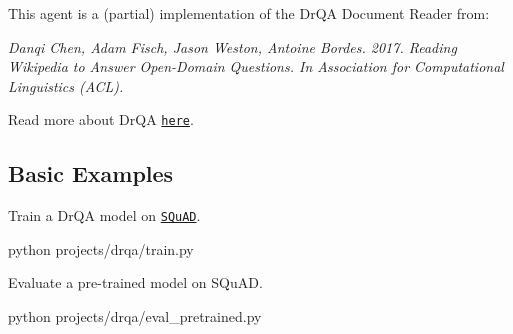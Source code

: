 This agent is a (partial) implementation of the Dr\+QA Document Reader from\+:

{\itshape Danqi Chen, Adam Fisch, Jason Weston, Antoine Bordes. 2017. Reading Wikipedia to Answer Open-\/\+Domain Questions. In Association for Computational Linguistics (A\+CL).}

Read more about Dr\+QA \href{https://arxiv.org/pdf/1704.00051.pdf}{\tt here}.

\subsection*{Basic Examples}

Train a Dr\+QA model on \href{https://rajpurkar.github.io/SQuAD-explorer/}{\tt S\+Qu\+AD}. 
\begin{DoxyCode}
python projects/drqa/train.py
\end{DoxyCode}


Evaluate a pre-\/trained model on S\+Qu\+AD. 
\begin{DoxyCode}
python projects/drqa/eval\_pretrained.py
\end{DoxyCode}
 